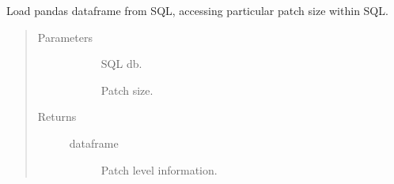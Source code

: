 \documentclass[letterpaper,10pt,english]{sphinxmanual}
\begin{document}
\begin{fulllineitems}
\label{\detokenize{index:pathflowai.utils.load_sql_df}}
Load pandas dataframe from SQL, accessing particular patch size within SQL.
\begin{quote}\begin{description}
\item[{Parameters}] \leavevmode\begin{description}
\item[{}] \leavevmode
SQL db.

\item[{}] \leavevmode
Patch size.

\end{description}

\item[{Returns}] \leavevmode\begin{description}
\item[{dataframe}] \leavevmode
Patch level information.

\end{description}

\end{description}\end{quote}

\end{fulllineitems}
\end{document}
